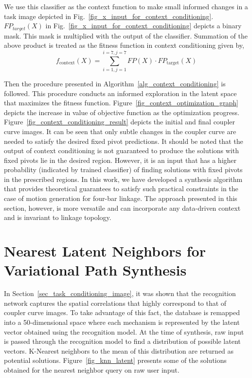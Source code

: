 We use this classifier as the context function to make small informed changes in a task image depicted in Fig.~\ref{fig_x_input_for_context_conditioning}. $FP_{target}(X)$ in Fig.~\ref{fig_x_input_for_context_conditioning} depicts a binary mask. This mask is multiplied with the output of the classifier. Summation of the above product is treated as the fitness function in context conditioning given by,
\begin{equation}
    f_{\text{context}}(X) = \sum_{i=1, j=1}^{i=7, j=7} {FP(X)} \cdot FP_{\text{target}}(X)
\end{equation}


Then the procedure presented in Algorithm~\ref{alg_context_conditioning} is followed.
This procedure conducts an informed exploration in the latent space that maximizes the fitness function. Figure~\ref{fig_context_optimization_graph} depicts the increase in value of objective function as the optimization progress. Figure~\ref{fig_context_conditioning_result} depicts the initial and final coupler curve images. It can be seen that only subtle changes in the coupler curve are needed to satisfy the desired fixed pivot predictions. It should be noted that the output of context conditioning is not guaranteed to produce the solutions with fixed pivots lie in the desired region. However, it is an input that has a higher probability (indicated by trained classifier) of finding solutions with fixed pivots in the prescribed regions. In this work, we have developed a synthesis algorithm that provides theoretical guarantees to satisfy such practical constraints in the case of motion generation for four-bar linkage. The approach presented in this section, however, is more versatile and can incorporate any data-driven context and is invariant to linkage topology.    


\section{Nearest Latent Neighbors for Variational Path Synthesis}

In Section~\ref{sec_task_conditioning_image}, it was shown that the recognition network captures the spatial correlations that highly correspond to that of coupler curve images. To take advantage of this fact, the database is remapped into a 50-dimensional space where each mechanism is represented by the latent vector obtained using the recognition model. At the time of synthesis, raw input is passed through the recognition model to find a distribution of possible latent vectors. K-Nearest neighbors to the mean of this distribution are returned as potential solutions. Figure~\ref{fig_knn_latent} presents some of the solutions obtained for the nearest neighbor query on raw user input. 


